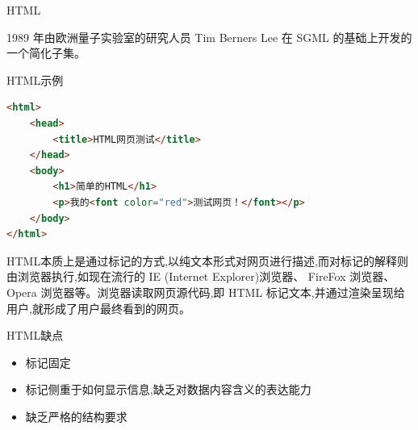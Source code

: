\begin{frame}{HTML}
\par 1989 年由欧洲量子实验室的研究人员 Tim Berners Lee 在 SGML 的基础上开发的一个简化子集。
\begin{exampleblock}{HTML示例}
  \begin{lstlisting}[tabsize=8,language=HTML]
<html>
    <head>
        <title>HTML网页测试</title>
    </head>
    <body>
        <h1>简单的HTML</h1>
        <p>我的<font color="red">测试网页！</font></p>
    </body>
</html>
  \end{lstlisting}
\end{exampleblock}

\newpage
\par HTML本质上是通过标记的方式,以纯文本形式对网页进行描述,而对标记的解释则由浏览器执行,如现在流行的 IE (Internet Explorer)浏览器、 FireFox 浏览器、 Opera 浏览器等。浏览器读取网页源代码,即 HTML 标记文本,并通过渲染呈现给用户,就形成了用户最终看到的网页。
\begin{exampleblock}{HTML缺点}
\begin{itemize} 
\item 标记固定
\item 标记侧重于如何显示信息,缺乏对数据内容含义的表达能力
\item 缺乏严格的结构要求
\end{itemize}
\end{exampleblock}
\end{frame}


